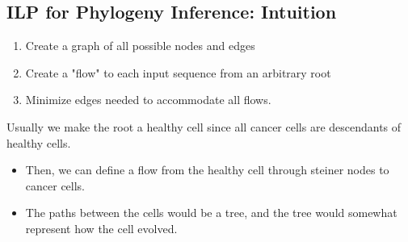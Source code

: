 \documentclass[10pt]{article}
\begin{document}
\subsection*{ILP for Phylogeny Inference: Intuition}
\begin{enumerate}
	\item Create a graph of all possible nodes and edges
	\item Create a "flow" to each input sequence from an arbitrary root
	\item Minimize edges needed to accommodate all flows.
\end{enumerate}
Usually we make the root a healthy cell since all cancer cells are descendants of healthy cells.
\begin{itemize}
	\item Then, we can define a flow from the healthy cell through steiner nodes to cancer cells.
	\item The paths between the cells would be a tree, and the tree would somewhat represent how the cell evolved.
\end{itemize}
\end{document}
